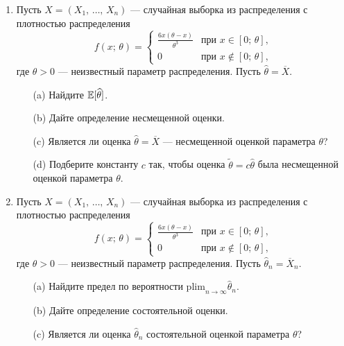 \documentclass[12pt, a4paper]{article}\usepackage[]{graphicx}\usepackage[]{color}
\begin{document}
\begin{enumerate}
\item
Пусть $X = (X_1, \, \ldots, \, X_n)$ — случайная выборка из распределения с плотностью распределения
\[
    f(x; \, \theta) = \left\{
                        \begin{array}{ll}
                          \frac{6x(\theta - x)}{\theta^3} & \text{при $x \in [0; \, \theta]$,} \\
                          0 & \text{при $x \not\in [0; \, \theta]$,}
                        \end{array}
                      \right.
\]
где $\theta > 0$ — неизвестный параметр распределения. Пусть $\widehat{\theta} = \overline{X}$.
\begin{itemize}
  \item[(a)] Найдите $\mathbb{E}[\widehat{\theta}]$.
  \item[(b)] Дайте определение несмещенной оценки.
  \item[(c)] Является ли оценка $\widehat{\theta} = \overline{X}$ — несмещенной оценкой параметра $\theta$?
  \item[(d)] Подберите константу $c$ так, чтобы оценка $\widetilde{\theta} = c \widehat{\theta}$ была несмещенной оценкой параметра $\theta$.
\end{itemize}

\item
Пусть $X = (X_1, \, \ldots, \, X_n)$ — случайная выборка из распределения с плотностью распределения
\[
    f(x; \, \theta) = \left\{
                        \begin{array}{ll}
                          \frac{6x(\theta - x)}{\theta^3} & \text{при $x \in [0; \, \theta]$,} \\
                          0 & \text{при $x \not\in [0; \, \theta]$,}
                        \end{array}
                      \right.
\]
где $\theta > 0$ — неизвестный параметр распределения. Пусть $\widehat{\theta}_n = \overline{X}_n$.
\begin{itemize}
  \item[(a)] Найдите предел по вероятности $\mathrm{plim}_{n \rightarrow \infty}\widehat{\theta}_n$.
  \item[(b)] Дайте определение состоятельной оценки.
  \item[(c)] Является ли оценка $\widehat{\theta}_n$ состоятельной оценкой параметра $\theta$?
\end{itemize}


\end{enumerate}
\end{document}
